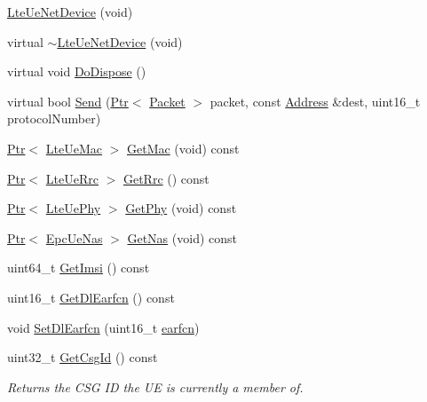 \begin{DoxyCompactItemize}
\item 
\hyperlink{classns3_1_1LteUeNetDevice_a119fa3851b0d20f2ead926ef3a39d1c4}{Lte\+Ue\+Net\+Device} (void)
\item 
virtual \hyperlink{classns3_1_1LteUeNetDevice_aff69cf728a8732f20ba347ad14e53dfe}{$\sim$\+Lte\+Ue\+Net\+Device} (void)
\item 
virtual void \hyperlink{classns3_1_1LteUeNetDevice_ab4da00b43baae4d2e3f96bb0d10bf31b}{Do\+Dispose} ()
\item 
virtual bool \hyperlink{classns3_1_1LteUeNetDevice_adad6545b0b0608e97f08c19d69fe50a1}{Send} (\hyperlink{classns3_1_1Ptr}{Ptr}$<$ \hyperlink{classns3_1_1Packet}{Packet} $>$ packet, const \hyperlink{classns3_1_1Address}{Address} \&dest, uint16\+\_\+t protocol\+Number)
\item 
\hyperlink{classns3_1_1Ptr}{Ptr}$<$ \hyperlink{classns3_1_1LteUeMac}{Lte\+Ue\+Mac} $>$ \hyperlink{classns3_1_1LteUeNetDevice_a0681d82b22b0d524360639dc69a520d9}{Get\+Mac} (void) const 
\item 
\hyperlink{classns3_1_1Ptr}{Ptr}$<$ \hyperlink{classns3_1_1LteUeRrc}{Lte\+Ue\+Rrc} $>$ \hyperlink{classns3_1_1LteUeNetDevice_a1f84e8e99aeb10f4242bbfc7b57a8128}{Get\+Rrc} () const 
\item 
\hyperlink{classns3_1_1Ptr}{Ptr}$<$ \hyperlink{classns3_1_1LteUePhy}{Lte\+Ue\+Phy} $>$ \hyperlink{classns3_1_1LteUeNetDevice_a2a9940a1e457a8bf3dae87fed4199c7a}{Get\+Phy} (void) const 
\item 
\hyperlink{classns3_1_1Ptr}{Ptr}$<$ \hyperlink{classns3_1_1EpcUeNas}{Epc\+Ue\+Nas} $>$ \hyperlink{classns3_1_1LteUeNetDevice_a089904af97980eca583a0df92f2777e9}{Get\+Nas} (void) const 
\item 
uint64\+\_\+t \hyperlink{classns3_1_1LteUeNetDevice_a673405bfed4b45c5714f17b0c3bad334}{Get\+Imsi} () const 
\item 
uint16\+\_\+t \hyperlink{classns3_1_1LteUeNetDevice_ae7ace25ff05b41f3cb1e12cb4a3ddb4b}{Get\+Dl\+Earfcn} () const 
\item 
void \hyperlink{classns3_1_1LteUeNetDevice_a0fc4fcacc87b616463294cecbfad0d63}{Set\+Dl\+Earfcn} (uint16\+\_\+t \hyperlink{generate__test__data__lte__spectrum__value__txpsd_8m_a584be7562abb392609629331f8c6c42c}{earfcn})
\item 
uint32\+\_\+t \hyperlink{classns3_1_1LteUeNetDevice_a09b66f2f590ae94bee107ef4f976949d}{Get\+Csg\+Id} () const 
\begin{DoxyCompactList}\small\item\em Returns the C\+SG ID the UE is currently a member of. \end{DoxyCompactList}\item 

\end{DoxyCompactItemize}
